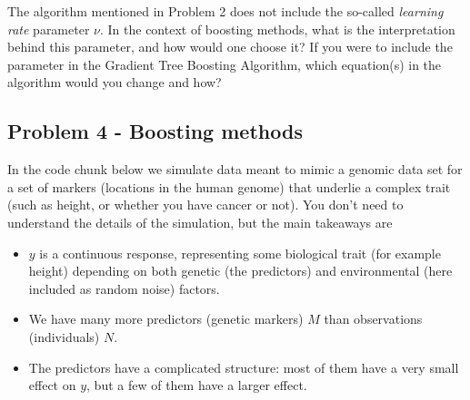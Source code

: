 \documentclass[
]{article}
\providecommand{\tightlist}{%
  \setlength{\itemsep}{0pt}\setlength{\parskip}{0pt}}
\begin{document}
The algorithm mentioned in Problem 2 does not include the so-called
\emph{learning rate} parameter \(\nu\). In the context of boosting
methods, what is the interpretation behind this parameter, and how would
one choose it? If you were to include the parameter in the Gradient Tree
Boosting Algorithm, which equation(s) in the algorithm would you change
and how?

\hypertarget{problem-4---boosting-methods}{%
\subsection{Problem 4 - Boosting
methods}\label{problem-4---boosting-methods}}

In the code chunk below we simulate data meant to mimic a genomic data
set for a set of markers (locations in the human genome) that underlie a
complex trait (such as height, or whether you have cancer or not). You
don't need to understand the details of the simulation, but the main
takeaways are

\begin{itemize}
\tightlist
\item
  \(y\) is a continuous response, representing some biological trait
  (for example height) depending on both genetic (the predictors) and
  environmental (here included as random noise) factors.
\item
  We have many more predictors (genetic markers) \(M\) than observations
  (individuals) \(N\).
\item
  The predictors have a complicated structure: most of them have a very
  small effect on \(y\), but a few of them have a larger effect.
\end{itemize}
\end{document}
